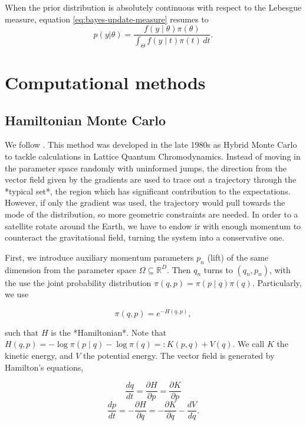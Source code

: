 When the prior distribution is absolutely continuous with respect to the
Lebesgue measure, equation \eqref{eq:bayes-update-measure} resumes to 
\begin{equation}
  p(y|\theta) = \frac{f(y\mid \theta)\pi(\theta)}{\int_{\Theta} f(y\mid t)\pi(t) \, dt}.  
\end{equation}

\section{Computational methods}
\label{sec:computational_methods}

\subsection{Hamiltonian Monte Carlo}
\label{sec:hamiltonian-monte-carlo}

We follow \cite{betancourt2017conceptual}. This method was developed in the late 1980s as Hybrid Monte Carlo to tackle calculations in Lattice Quantum Chromodynamics. Instead of moving in the parameter space randomly with uninformed jumps, the direction from the vector field given by the gradients are used to trace out a trajectory through the *typical set*, the region which has significant contribution to the expectations. However, if only the gradient was used, the trajectory would pull towards the mode of the distribution, so more geometric constraints are needed. In order to a satellite rotate around the Earth, we have to endow ir with enough momentum to counteract the gravitational field, turning the system into a conservative one. 

First, we introduce auxiliary momentum parameters $p_n$ (lift) of the same dimension from the parameter space $\Omega \subseteq \mathbb{R}^D$. Then $q_n$ turns to $(q_n, p_n)$, with the use the joint probability distribution $\pi(q,p) = \pi(p\mid q)\pi(q)$. Particularly, we use 

$$
\pi(q,p) = e^{-H(q,p)}, 
$$

such that $H$ is the *Hamiltonian*. Note that $H(q,p) = -\log \pi(p\mid q) - \log \pi(q) =: K(p,q) + V(q)$. We call $K$ the kinetic energy, and $V$ the potential energy. The vector field is generated by Hamilton's equations, 

$$
\frac{dq}{dt} = \frac{\partial H}{\partial p} = \frac{\partial K}{\partial p}
$$
$$
\frac{dp}{dt} = -\frac{\partial H}{\partial q} = -\frac{\partial K}{\partial q} - \frac{d V}{d q}.
$$

